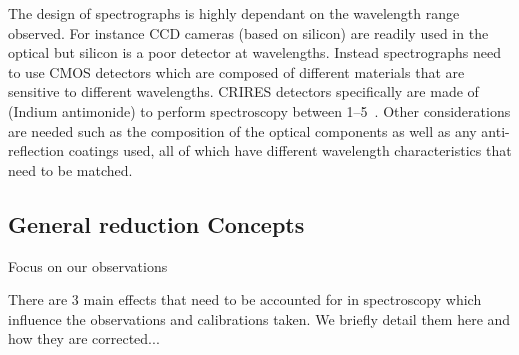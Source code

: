 The design of spectrographs is highly dependant on the wavelength range observed. For instance {CCD} cameras (based on silicon) are readily used in the optical but silicon is a poor detector at \nir{} wavelengths.
Instead \nir{} spectrographs need to use CMOS detectors which are composed of different materials that are sensitive to different wavelengths.
{CRIRES} detectors specifically are made of  (Indium antimonide) to perform spectroscopy between 1--5\um{}~\cite{dorn_crires_2004}.
Other considerations are needed such as the composition of the optical components as well as any anti-reflection coatings used, all of which have different wavelength characteristics that need to be matched.


\subsection{General reduction Concepts}
\label{subsec:nirreduction}

Focus on our observations\todo{}

There are 3 main effects that need to be accounted for in \nir{} spectroscopy which influence the observations and calibrations taken.
We briefly detail them here and how they are corrected... 

